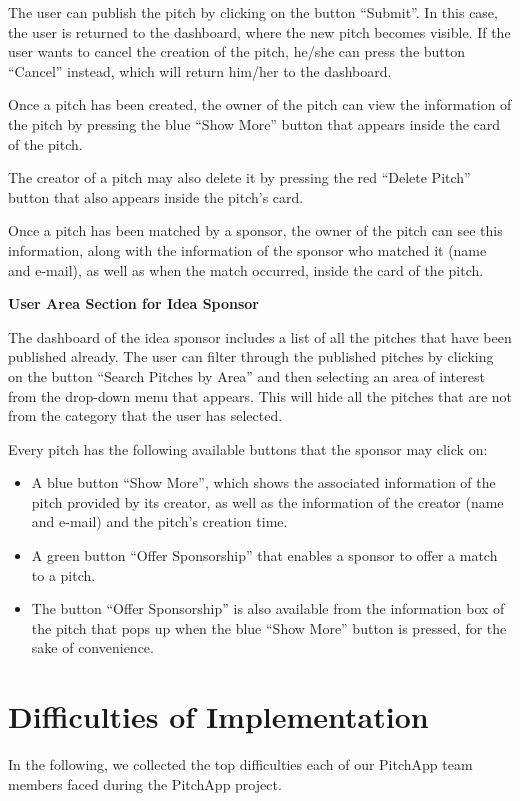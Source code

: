 The user can publish the pitch by clicking on the button “Submit”. In this case, the user is returned to the dashboard, where the new pitch becomes visible.
If the user wants to cancel the creation of the pitch, he/she can press the button “Cancel” instead, which will return him/her to the dashboard.

Once a pitch has been created, the owner of the pitch can view the information of the pitch by pressing the blue “Show More” button that appears inside the card of the pitch.

The creator of a pitch may also delete it by pressing the red “Delete Pitch” button that also appears inside the pitch’s card.

Once a pitch has been matched by a sponsor, the owner of the pitch can see this information, along with the information of the sponsor who matched it (name and e-mail), as well as when the match occurred, inside the card of the pitch.


\textbf{User Area Section for Idea Sponsor}

The dashboard of the idea sponsor includes a list of all the pitches that have been published already.
The user can filter through the published pitches by clicking on the button “Search Pitches by Area” and then selecting an area of interest from the drop-down menu that appears. This will hide all the pitches that are not from the category that the user has selected.

Every pitch has the following available buttons that the sponsor may click on:

\begin{itemize}
\item A blue button “Show More”, which shows the associated information of the pitch provided by its creator, as well as the information of the creator (name and e-mail) and the pitch’s creation time.
\item A green button “Offer Sponsorship” that enables a sponsor to offer a match to a pitch.
\item The button “Offer Sponsorship” is also available from the information box of the pitch that pops up when the blue “Show More” button is pressed, for the sake of convenience.
\end{itemize}

\chapter{Difficulties of Implementation}
In the following, we collected the top difficulties each of our PitchApp team members faced during the PitchApp project.

